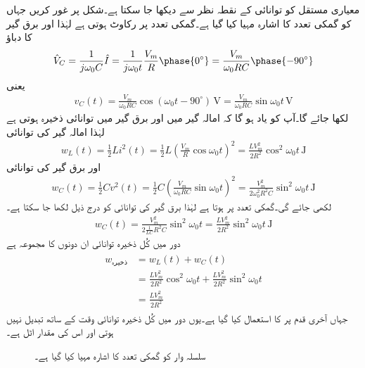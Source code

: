 معیاری مستقل  کو توانائی کے نقطہ نظر سے دیکھا جا سکتا ہے۔شکل  پر غور کریں جہاں  کو گمکی تعدد کا اشارہ مہیا کیا گیا ہے۔گمکی تعدد پر رکاوٹ  ہوتی ہے لہٰذا  اور برق گیر کا دباؤ 
\begin{align*}
\hat{V}_C=\frac{1}{j\omega_0 C} \hat{I}=\frac{1}{j\omega_0 t}\frac{V_m}{R}\phase{0^{\circ}}=\frac{V_m}{\omega_0 RC}\phase{-90^{\circ}}
\end{align*}
یعنی
\begin{align*}
v_C(t)=\frac{V_m}{\omega_0 RC} \cos (\omega_0 t -90^{\circ})\,\si{\volt}=\frac{V_m}{\omega_0 RC} \sin \omega_0 t \,\si{\volt}
\end{align*}
لکھا جائے گا۔آپ کو یاد ہو گا کہ امالہ گیر میں  اور برق گیر میں  توانائی ذخیرہ ہوتی ہے لہٰذا امالہ گیر کی توانائی
\begin{align}\label{مساوات_تعددی_امالی_ذخیرہ_توانائی}
w_L(t)=\frac{1}{2} L i^2(t)=\frac{1}{2} L \left(\frac{V_m}{R} \cos \omega_0 t\right)^2=\frac{L V_m^2}{2 R^2}\cos^2 \omega_0 t \, \si{\joule}
\end{align}
اور برق گیر کی توانائی
\begin{align*}
w_C(t)=\frac{1}{2} C v^2(t)=\frac{1}{2} C\left(\frac{V_m}{\omega_0 RC} \sin \omega_0 t\right)^2=\frac{V_m^2}{2\omega_0^2 R^2C}\sin^2 \omega_0 t \, \si{\joule}
\end{align*}
لکھی جائے گی۔گمکی تعدد پر  ہوتا ہے لہٰذا برق گیر کی توانائی کو درج ذیل لکھا جا سکتا ہے۔
\begin{align}\label{مساوات_تعددی_برق_گیر_ذخیرہ_توانائی}
w_C(t)=\frac{V_m^2}{2\frac{1}{LC} R^2C}\sin^2 \omega_0 t=\frac{LV_m^2}{2R^2}\sin^2 \omega_0 t \, \si{\joule}
\end{align}
دور میں کُل ذخیرہ توانائی ان دونوں کا مجموعہ ہے
\begin{gather}
\begin{aligned}\label{مساوات_تعددی_کل_ذخیرہ_توانائی}
w_{\text{ذخیرہ}}&=w_L(t)+w_C(t)\\
&=\frac{LV_m^2}{2R^2}\cos^2 \omega_0 t+\frac{LV_m^2}{2R^2}\sin^2 \omega_0 t\\
&=\frac{LV_m^2}{2R^2}
\end{aligned}
\end{gather}
جہاں آخری قدم پر  کا استعمال کیا گیا ہے۔یوں دور میں کُل ذخیرہ توانائی وقت کے ساتھ تبدیل نہیں ہوتی اور اس کی مقدار اٹل ہے۔
\begin{figure}
\centering
{}
\caption{سلسلہ وار  کو گمکی تعدد کا اشارہ مہیا کیا گیا ہے۔}
\label{شکل_تعددی_امالہ_معیاری_مستقل_توانائی_کے_نقطہ_نظر}
\end{figure}


